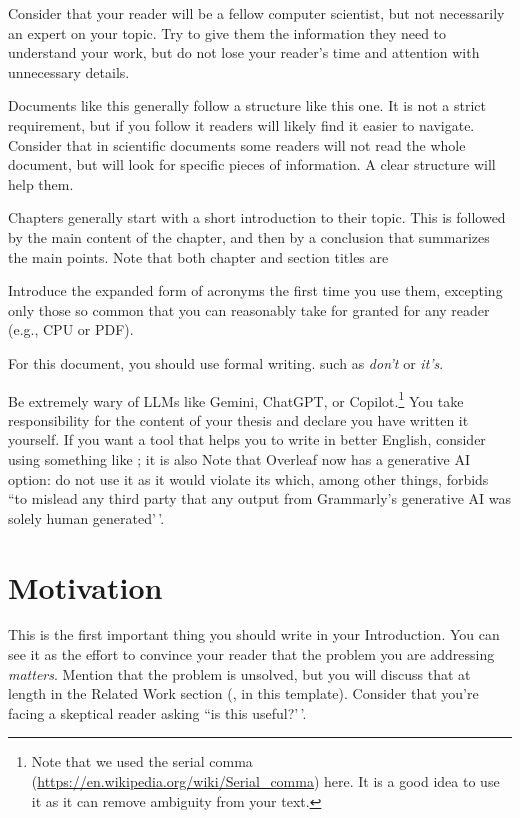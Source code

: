 Consider that your reader will be a fellow computer scientist, but not
necessarily an expert on your topic. Try to give them the information
they need to understand your work, but do not lose your reader's time
and attention with unnecessary details.

Documents like this generally follow a structure like this one. It is
not a strict requirement, but if you follow it readers will likely find
it easier to navigate. Consider that in scientific documents some
readers will not read the whole document, but will look for specific
pieces of information. A clear structure will help them.

Chapters generally start with a short introduction to their topic. This
is followed by the main content of the chapter, and then by a conclusion
that summarizes the main points. Note that both chapter and section
titles are

Introduce the expanded form of acronyms the first time you use them,
excepting only those so common that you can reasonably take for granted
for any reader (e.g., CPU or PDF).

For this document, you should use formal writing.
such as \emph{don't} or \emph{it's}.

Be extremely wary of \acp{LLM} like Gemini, ChatGPT, or
Copilot.\footnote{Note that we used the serial comma (\url{https://en.wikipedia.org/wiki/Serial_comma}) here. It is a good idea to use it as it can remove ambiguity from your text.}
You take responsibility for the content of your thesis and declare you
have written it yourself. If you want a tool that helps you to write in
better English, consider using something like
; it is also
Note that Overleaf now has a generative AI option: do not use it as it
would violate its
 which, among
other things, forbids ``to mislead any third party that any output from
Grammarly's generative AI was solely human generated'\,'.

\section{Motivation}

This is the first important thing you should write in your Introduction.
You can see it as the effort to convince your reader that the problem
you are addressing \emph{matters}. Mention that the problem is unsolved,
but you will discuss that at length in the Related Work section
(, in this template). Consider that you're facing a
skeptical reader asking ``is this useful?'\,'.

